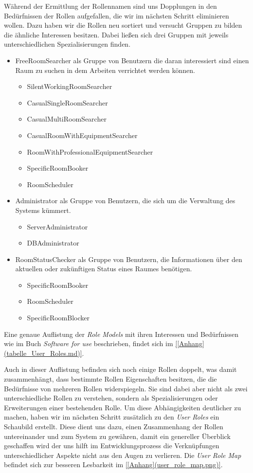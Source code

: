 Während der Ermittlung der Rollennamen sind uns Dopplungen in den Bedürfnissen
der Rollen aufgefallen, die wir im nächsten Schritt eliminieren wollen.
Dazu haben wir die Rollen neu sortiert und versucht Gruppen zu bilden die
ähnliche Interessen besitzen.
Dabei ließen sich drei Gruppen mit jeweils unterschiedlichen Spezialisierungen finden.

\begin{itemize}
	\item FreeRoomSearcher als Gruppe von Benutzern die daran interessiert sind einen Raum zu suchen in dem Arbeiten verrichtet werden können.
	\begin{itemize}
		\item SilentWorkingRoomSearcher
    	\item CasualSingleRoomSearcher
   		\item CasualMultiRoomSearcher
    	\item CasualRoomWithEquipmentSearcher
    	\item RoomWithProfessionalEquipmentSearcher
    	\item SpecificRoomBooker
    	\item RoomScheduler
	\end{itemize}
	\item Administrator als Gruppe von Benutzern, die sich um die Verwaltung des Systems kümmert.
	\begin{itemize}
	    \item ServerAdministrator
    	\item DBAdministrator
	\end{itemize}
	\item RoomStatusChecker als Gruppe von Benutzern, die Informationen über den aktuellen oder zukünftigen Status eines Raumes benötigen.
	\begin{itemize}
		\item SpecificRoomBooker
		\item RoomScheduler
		\item SpecificRoomBlocker
	\end{itemize}
\end{itemize}

Eine genaue Auflistung der \textit{Role Models} mit ihren Interessen und Bedürfnissen
wie im Buch \textit{Software for use} beschrieben, findet sich im \ref{[Anhang](tabelle_User_Roles.md)}.

Auch in dieser Auflistung befinden sich noch einige Rollen doppelt, was damit
zusammenhängt, dass bestimmte Rollen Eigenschaften besitzen, die die
Bedürfnisse von mehreren Rollen widerspiegeln. Sie sind dabei aber nicht als
zwei unterschiedliche Rollen zu verstehen, sondern als Spezialisierungen oder
Erweiterungen einer bestehenden Rolle. Um diese Abhängigkeiten deutlicher zu
machen, haben wir im nächsten Schritt zusätzlich zu den \textit{User Roles} ein
Schaubild erstellt. Diese \textit{\citep{[User Role Map](Buchverweis)}} dient uns dazu,
einen Zusammenhang der Rollen untereinander und zum System zu gewähren, damit
ein genereller Überblick geschaffen wird der uns hilft im Entwicklungsprozess
die Verknüpfungen unterschiedlicher Aspekte nicht aus den Augen zu verlieren.
Die \textit{User Role Map} befindet sich zur besseren Lesbarkeit im \ref{[Anhang](user_role_map.png)}.

